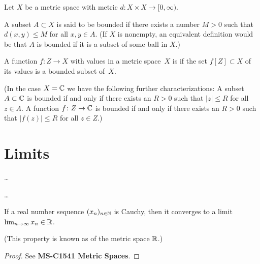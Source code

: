 \begin{definition}[Boundedness]
  \label{def:bounded}
  Let $X$ be a metric space with metric $d \colon X \times X \to [0,\infty)$.

  A subset $A \subset X$ is said to be bounded if there exists
  a number $M>0$ such that $d(x,y) \le M$ for all $x,y \in A$.
  (If $X$ is nonempty, an equivalent definition would be that
  $A$ is bounded if it is a subset of some ball in $X$.)

  A function $f \colon Z \to X$ with values in a metric space~$X$
  is  if the set $f[Z] \subset X$ of its values is a
  bounded subset of~$X$.

  (In the case $X = \mathbb{C}$ we have the following further characterizations:
  A subset $A \subset \mathbb{C}$ is bounded if and only if there exists an $R>0$
  such that $|z| \le R$ for all $z \in A$. A function $f \colon Z \to \mathbb{C}$
  is bounded if and only if there exists an $R>0$ such that $|f(z)| \le R$
  for all $z \in Z$.)
\end{definition}



\section{Limits}

\begin{definition}[Limit]
  \label{def:limit}
  \ldots
\end{definition}

\begin{definition}
  \label{def:cauchy_sequence}
  \ldots
\end{definition}

\begin{lemma}
  \label{lem:real_complete}
  If a real number sequence $(x_n)_{n \in \mathbb{N}}$ is Cauchy,
  then it converges to a limit $\lim_{n \to \infty} x_n \in \mathbb{R}$.

  (This property is known as  of the metric space $\mathbb{R}$.)
\end{lemma}
\begin{proof}
  See \textbf{MS-C1541 Metric Spaces}.
\end{proof}

